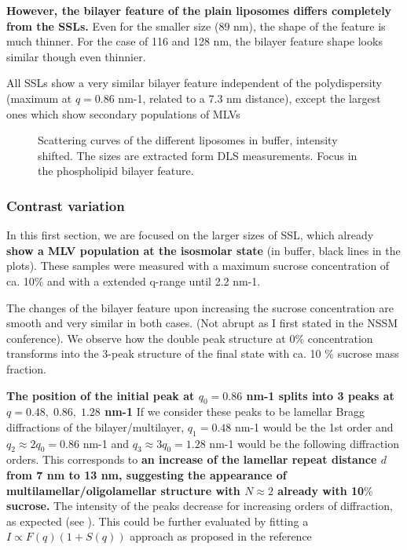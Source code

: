 \textbf{However, the bilayer feature of the plain liposomes differs completely from the SSLs.} Even for the smaller size (89 nm), the shape of the feature is much thinner. For the case of 116 and 128 nm, the bilayer feature shape looks similar though even thinnier.

All SSLs show a very similar bilayer feature independent of the polydispersity (maximum at $q=0.86$ nm-1, related to a 7.3 nm distance), except the largest ones which show secondary populations of MLVs

\begin{figure}
	\centering
		
		\caption{Scattering curves of the different liposomes in buffer, intensity shifted. The sizes are extracted form DLS measurements. Focus in the phospholipid bilayer feature.}
		\label{fig:SSLSingleContrastBilayer}
\end{figure}

\subsubsection{Contrast variation}

In this first section, we are focused on the larger sizes of SSL, which already \textbf{show a MLV population at the isosmolar state} (in buffer, black lines in the plots). These samples were measured with a maximum sucrose concentration of ca. 10$\%$ and with a extended q-range until 2.2 nm-1.

The changes of the bilayer feature upon increasing the sucrose concentration are smooth and very similar in both cases. (Not abrupt as I first stated in the NSSM conference). We observe how the double peak structure at 0$\%$ concentration transforms into the 3-peak structure of the final state with ca. 10 $\%$ sucrose mass fraction.

\textbf{The position of the initial peak at $q_0=0.86$ nm-1 splits into 3 peaks at $q=0.48 ,\; 0.86  ,\; 1.28$ nm-1} If we consider these peaks to be lamellar Bragg diffractions of the bilayer/multilayer, $q_1=0.48$ nm-1 would be the 1st order and $q_{2}\approx2q_0=0.86$ nm-1 and  $q_{3}\approx3q_0=1.28$ nm-1 would be the following diffraction orders. This corresponds to \textbf{an increase of the lamellar repeat distance $d$ from 7 nm to 13 nm, suggesting the appearance of multilamellar/oligolamellar structure with $N\approx2$ already with 10$\%$ sucrose.} The intensity of the peaks decrease for increasing orders of diffraction, as expected (see  \cite{fernandez_influence_2008}). This could be further evaluated by fitting a $I \propto F(q) (1+S(q))$ approach as proposed in the reference \cite{fernandez_influence_2008}

